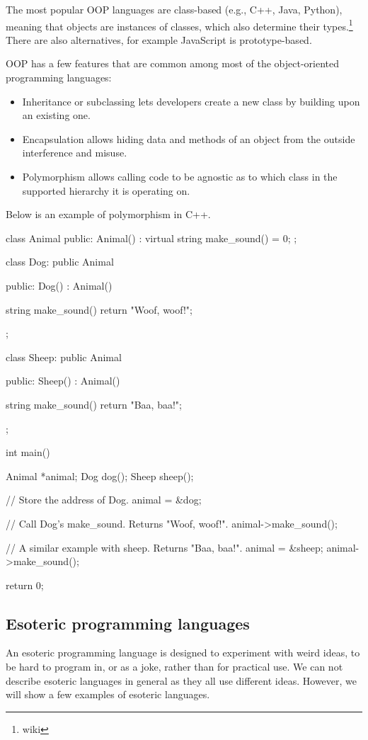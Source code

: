 The most popular OOP languages are class-based (e.g., C++, Java, Python), meaning that objects are instances of classes, which also determine their types.\footnote{wiki}
There are also alternatives, for example JavaScript is prototype-based.

OOP has a few features that are common among most of the object-oriented programming languages:
\begin{itemize}
    \item Inheritance or subclassing lets developers create a new class by building upon an existing one.
    \item Encapsulation allows hiding data and methods of an object from the outside interference and misuse.
    \item Polymorphism allows calling code to be agnostic as to which class in the supported hierarchy it is operating on.
\end{itemize}

Below is an example of polymorphism in C++.
\begin{code}
class Animal {
public:
    Animal() : { }
    virtual string make_sound() = 0;
};

class Dog: public Animal {
public:
    Dog() : Animal() { }
      
    string make_sound() { 
        return "Woof, woof!"; 
    }
};

class Sheep: public Animal {
public:
    Sheep() : Animal() { }
      
    string make_sound() { 
        return "Baa, baa!"; 
    }
};

int main() {
    Animal *animal;
    Dog dog();
    Sheep sheep();

    // Store the address of Dog.
    animal = &dog;

    // Call Dog's make_sound. Returns "Woof, woof!".
    animal->make_sound();

    // A similar example with sheep. Returns "Baa, baa!".
    animal = &sheep;
    animal->make_sound();

    return 0;
}
\end{code}

\subsection{Esoteric programming languages}
An esoteric programming language is designed to experiment with weird ideas, to be hard to program in, or as a joke, rather than for practical use. We can not
describe esoteric languages in general as they all use different ideas. However, we will show a few examples of esoteric languages.

